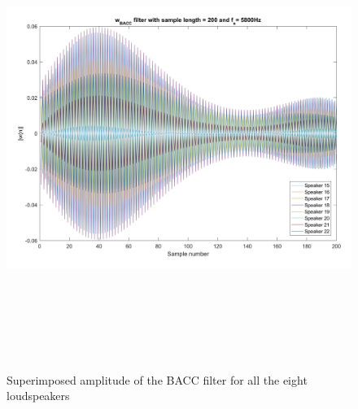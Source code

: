 \begin{figure}[H]
\centering
\includegraphics[width=15cm,height=15cm,keepaspectratio]{Figures/filter_strange}
\decoRule
\caption[Superimposed amplitude]{Superimposed amplitude of the BACC filter for all the eight loudspeakers}
\label{fig:filter_strange}
\end{figure}

